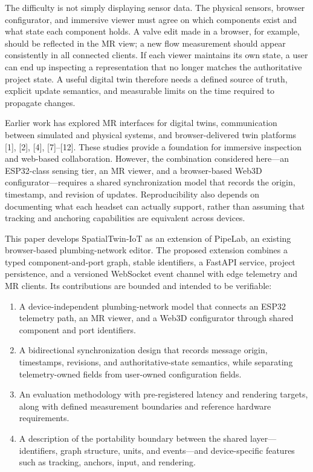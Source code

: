 \documentclass[conference]{IEEEtran}
\begin{document}
The difficulty is not simply displaying sensor data. The physical sensors, browser configurator, and immersive viewer must agree on which components exist and what state each component holds. A valve edit made in a browser, for example, should be reflected in the MR view; a new flow measurement should appear consistently in all connected clients. If each viewer maintains its own state, a user can end up inspecting a representation that no longer matches the authoritative project state. A useful digital twin therefore needs a defined source of truth, explicit update semantics, and measurable limits on the time required to propagate changes.

Earlier work has explored MR interfaces for digital twins, communication between simulated and physical systems, and browser-delivered twin platforms [1], [2], [4], [7]--[12]. These studies provide a foundation for immersive inspection and web-based collaboration. However, the combination considered here---an ESP32-class sensing tier, an MR viewer, and a browser-based Web3D configurator---requires a shared synchronization model that records the origin, timestamp, and revision of updates. Reproducibility also depends on documenting what each headset can actually support, rather than assuming that tracking and anchoring capabilities are equivalent across devices.

This paper develops SpatialTwin-IoT as an extension of PipeLab, an existing browser-based plumbing-network editor. The proposed extension combines a typed component-and-port graph, stable identifiers, a FastAPI service, project persistence, and a versioned WebSocket event channel with edge telemetry and MR clients. Its contributions are bounded and intended to be verifiable:
\begin{enumerate}
  \item A device-independent plumbing-network model that connects an ESP32 telemetry path, an MR viewer, and a Web3D configurator through shared component and port identifiers.
  \item A bidirectional synchronization design that records message origin, timestamps, revisions, and authoritative-state semantics, while separating telemetry-owned fields from user-owned configuration fields.
  \item An evaluation methodology with pre-registered latency and rendering targets, along with defined measurement boundaries and reference hardware requirements.
  \item A description of the portability boundary between the shared layer---identifiers, graph structure, units, and events---and device-specific features such as tracking, anchors, input, and rendering.
\end{enumerate}
\end{document}
